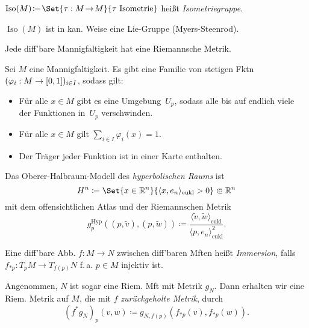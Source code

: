 \documentclass{cheat-sheet}
\DeclareMathOperator{\Iso}{Iso} %
\begin{document}
\begin{defn}
  $\Iso(M) \!\coloneqq\! \Set{ \tau : M \!\to\! M }{ \tau \text{ Isometrie} }$ heißt \emph{Isometriegruppe}.
\end{defn}

\begin{bem}
  $\Iso(M)$ ist in kan. Weise eine Lie-Gruppe (Myers-Steenrod).
\end{bem}

\begin{satz}
  Jede diff'bare Mannigfaltigkeit hat eine Riemannsche Metrik.
\end{satz}

\begin{technik}
  Sei $M$ eine Mannigfaltigkeit.
  Es gibt eine Familie von stetigen Fktn $(\varphi_i : M \to \left[ 0, 1 \right])_{i \in I}$, sodass gilt:
  \begin{itemize}
    \item Für alle $x \in M$ gibt es eine Umgebung~$U_p$, sodass alle bis auf endlich viele der Funktionen in~$U_p$ verschwinden.
    \item Für alle $x \in M$ gilt ${\sum}_{i \in I} \varphi_i(x) = 1$.
    \item Der Träger jeder Funktion ist in einer Karte enthalten.
  \end{itemize}
\end{technik}

\begin{bsp}
  Das Oberer-Halbraum-Modell des \textit{hyperbolischen Raums} ist
  \[ H^n \coloneqq \Set{x \in \R^n}{\langle x, e_n \rangle_{\text{eukl}} > 0} \opn \R^n \]
  mit dem offensichtlichen Atlas und der Riemannschen Metrik
  \[ g_p^{\text{Hyp}} ((p, \tilde{v}), (p, \tilde{w})) \coloneqq \frac{\langle \tilde{v}, \tilde{w} \rangle_{\text{eukl}}}{\langle p, e_n \rangle_{\text{eukl}}^2}. \]
\end{bsp}

\begin{defn}
  Eine diff'bare Abb. $f : M \to N$ zwischen diff'baren Mften heißt \emph{Immersion}, falls $f_{*p} : T_p M \to T_{f(p)} N$ f.\,a. $p \in M$ injektiv ist.
\end{defn}

\begin{defn}
  Angenommen, $N$ ist sogar eine Riem. Mft mit Metrik $g_N$. Dann erhalten wir eine Riem. Metrik auf $M$, die mit $f$ \emph{zurückgeholte Metrik}, durch
  \[ (f^* g_N)_p (v, w) \coloneqq g_{N,f(p)}(f_{*p}(v), f_{*p}(w)). \]
\end{defn}
\end{document}
